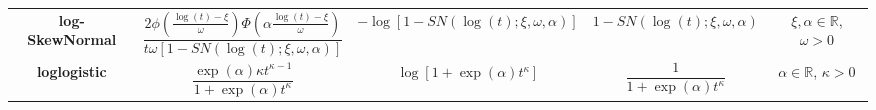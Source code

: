 \begin{sidewaystable}[]
\begin{tabular}{ccccc}
  {\bf log-SkewNormal}
    & $\dfrac{
        2
        \phi\left(\frac{\log(t) - \xi}{\omega}\right)
        \Phi\left(\alpha\frac{\log(t)-\xi}{\omega}\right)
        }{
         t \omega \left[1 - SN\left(\log(t); \xi, \omega, \alpha \right) \right]}$
    & $- \log \left[1 - SN\left(\log(t); \xi, \omega, \alpha \right)\right]$
    & $1 - SN\left(\log(t); \xi, \omega, \alpha \right)$
    & $\xi, \alpha \in \mathbb{R}$, $\omega > 0$
  \\ %
  {\bf loglogistic}
    & $\dfrac{\exp(\alpha) \kappa t^{\kappa - 1}}{1 + \exp(\alpha) t^{\kappa}}$
    & $\log \left[1 + \exp(\alpha) t^{\kappa}\right]$
    & $\dfrac1{1 + \exp(\alpha) t^{\kappa}}$
    & $\alpha \in \mathbb{R}$, $\kappa > 0$
    \\[1em]
	\hline \hline
	\end{tabular}
\end{sidewaystable} 
\singlespacing